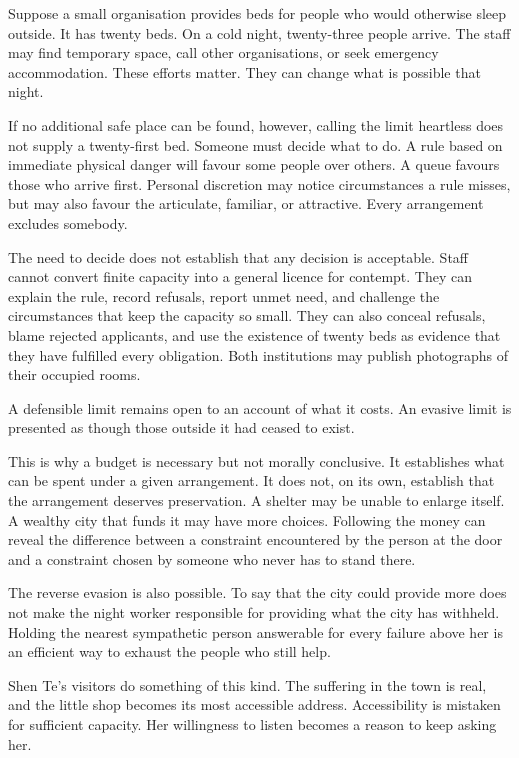 \documentclass[12pt,a4paper]{book}
\begin{document}
Suppose a small organisation provides beds for people who would otherwise sleep outside. It has twenty beds. On a cold night, twenty-three people arrive. The staff may find temporary space, call other organisations, or seek emergency accommodation. These efforts matter. They can change what is possible that night.

If no additional safe place can be found, however, calling the limit heartless does not supply a twenty-first bed. Someone must decide what to do. A rule based on immediate physical danger will favour some people over others. A queue favours those who arrive first. Personal discretion may notice circumstances a rule misses, but may also favour the articulate, familiar, or attractive. Every arrangement excludes somebody.

The need to decide does not establish that any decision is acceptable. Staff cannot convert finite capacity into a general licence for contempt. They can explain the rule, record refusals, report unmet need, and challenge the circumstances that keep the capacity so small. They can also conceal refusals, blame rejected applicants, and use the existence of twenty beds as evidence that they have fulfilled every obligation. Both institutions may publish photographs of their occupied rooms.

A defensible limit remains open to an account of what it costs. An evasive limit is presented as though those outside it had ceased to exist.

This is why a budget is necessary but not morally conclusive. It establishes what can be spent under a given arrangement. It does not, on its own, establish that the arrangement deserves preservation. A shelter may be unable to enlarge itself. A wealthy city that funds it may have more choices. Following the money can reveal the difference between a constraint encountered by the person at the door and a constraint chosen by someone who never has to stand there.

The reverse evasion is also possible. To say that the city could provide more does not make the night worker responsible for providing what the city has withheld. Holding the nearest sympathetic person answerable for every failure above her is an efficient way to exhaust the people who still help.

Shen Te's visitors do something of this kind. The suffering in the town is real, and the little shop becomes its most accessible address. Accessibility is mistaken for sufficient capacity. Her willingness to listen becomes a reason to keep asking her.
\end{document}
